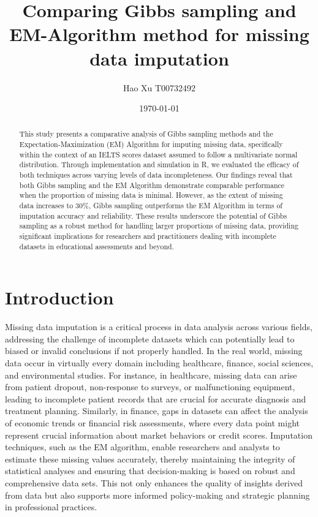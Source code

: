 \documentclass[12pt]{article}
\title{Comparing Gibbs sampling and EM-Algorithm method for missing data imputation}
\author{Hao Xu T00732492}
\date{\today}
\begin{document}
\maketitle

\begin{abstract}

This study presents a comparative analysis of Gibbs sampling methods and the Expectation-Maximization (EM) Algorithm for imputing missing data, specifically within the context of an IELTS scores dataset assumed to follow a multivariate normal distribution. Through implementation and simulation in R, we evaluated the efficacy of both techniques across varying levels of data incompleteness. Our findings reveal that both Gibbs sampling and the EM Algorithm demonstrate comparable performance when the proportion of missing data is minimal. However, as the extent of missing data increases to 30\%, Gibbs sampling outperforms the EM Algorithm in terms of imputation accuracy and reliability. These results underscore the potential of Gibbs sampling as a robust method for handling larger proportions of missing data, providing significant implications for researchers and practitioners dealing with incomplete datasets in educational assessments and beyond.

\end{abstract}

\section{Introduction}

Missing data imputation is a critical process in data analysis across various fields, addressing the challenge of incomplete datasets which can potentially lead to biased or invalid conclusions if not properly handled. In the real world, missing data occur in virtually every domain including healthcare, finance, social sciences, and environmental studies. For instance, in healthcare, missing data can arise from patient dropout, non-response to surveys, or malfunctioning equipment, leading to incomplete patient records that are crucial for accurate diagnosis and treatment planning. Similarly, in finance, gaps in datasets can affect the analysis of economic trends or financial risk assessments, where every data point might represent crucial information about market behaviors or credit scores. Imputation techniques, such as the EM algorithm, enable researchers and analysts to estimate these missing values accurately, thereby maintaining the integrity of statistical analyses and ensuring that decision-making is based on robust and comprehensive data sets. This not only enhances the quality of insights derived from data but also supports more informed policy-making and strategic planning in professional practices.
\end{document}
